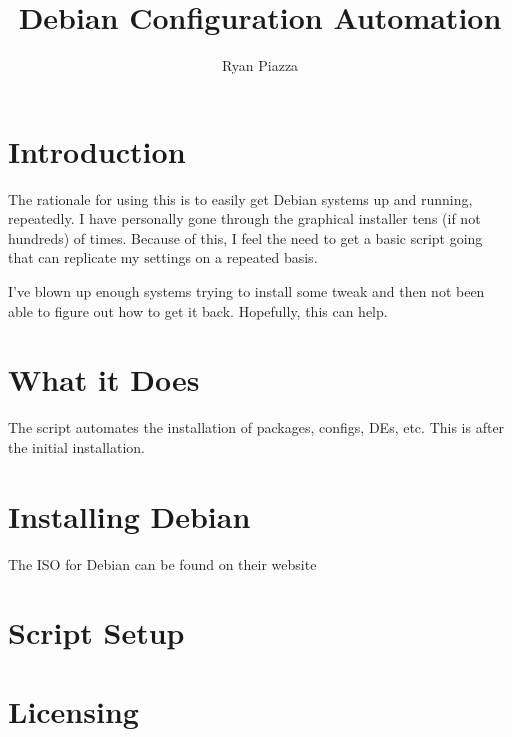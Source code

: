\documentclass{article}
\title{Debian Configuration Automation}
\author{Ryan Piazza}
\begin{document}
\tableofcontents

\maketitle

\section{Introduction}

The rationale for using this is to easily get Debian systems up and running, repeatedly. I have personally gone through the graphical installer tens (if not hundreds) of times. Because of this, I feel the need to get a basic script going that can replicate my settings on a repeated basis. 

I've blown up enough systems trying to install some tweak and then not been able to figure out how to get it back. Hopefully, this can help. 

\section{What it Does}

The script automates the installation of packages, configs, DEs, etc. This is after the initial installation. 

\blindtext

\section{Installing Debian}

The ISO for Debian can be found on their website 

\blindtext

\section{Script Setup}

\blindtext

\section{Licensing}
\end{document}
